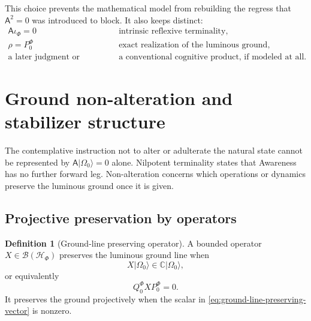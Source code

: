 \documentclass[11pt,reqno]{scrartcl}
\newcommand{\CC}{\mathbb C}
\newcommand{\scrHF}{\mathscr H_{\Phi}}
\newcommand{\PzeroF}{P_{0}^{\Phi}}
\newcommand{\QzeroF}{Q_{0}^{\Phi}}
\newcommand{\Aodd}{\mathsf A}
\newcommand{\iF}{\iota_{\Phi}}
\newcommand{\ket}[1]{\lvert #1\rangle}
\theoremstyle{plain}
\theoremstyle{definition}
\newtheorem{definition}[definition]{Definition}
\theoremstyle{remark}
\begin{document}
This choice prevents the mathematical model from rebuilding the regress that
$\Aodd^2=0$ was introduced to block.  It also keeps distinct:
\begin{equation}
  \boxed{
  \begin{aligned}
  \Aodd\iF=0
  &\quad\text{intrinsic reflexive terminality},\\
  \rho=\PzeroF
  &\quad\text{exact realization of the luminous ground},\\
  \text{a later judgment or report}
  &\quad\text{a conventional cognitive product, if modeled at all}.
  \end{aligned}}
  \label{eq:three-level-reflexivity-realization-report}
\end{equation}
\section{Ground non-alteration and stabilizer structure}
\label{sec:ground-nonalteration}

The contemplative instruction not to alter or adulterate the natural state
cannot be represented by $\Aodd\ket{\Omega_0}=0$ alone.  Nilpotent terminality
states that Awareness has no further forward leg.  Non-alteration concerns
which operations or dynamics preserve the luminous ground once it is given.

\subsection{Projective preservation by operators}

\begin{definition}[Ground-line preserving operator]
\label{def:ground-line-preserving-operator}
A bounded operator $X\in\mathcal B(\scrHF)$ preserves the luminous ground line
when
\begin{equation}
  X\ket{\Omega_0}\in\CC\ket{\Omega_0},
  \label{eq:ground-line-preserving-vector}
\end{equation}
or equivalently
\begin{equation}
  \QzeroF X\PzeroF=0.
  \label{eq:ground-line-preserving-block}
\end{equation}
It preserves the ground projectively when the scalar in
\eqref{eq:ground-line-preserving-vector} is nonzero.
\end{definition}
\end{document}
